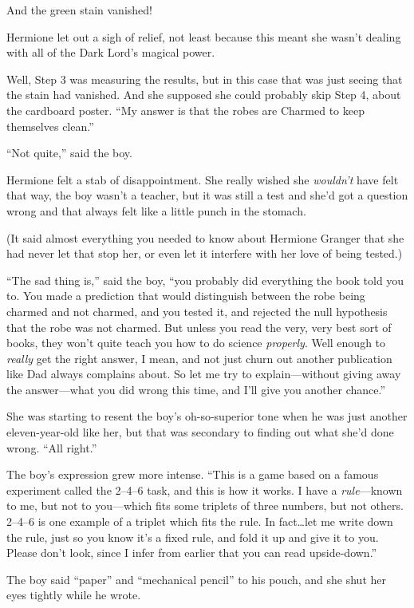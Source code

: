 And the green stain vanished!

Hermione let out a sigh of relief, not least because this meant she wasn’t dealing with all of the Dark Lord’s magical power.

Well, Step 3 was measuring the results, but in this case that was just seeing that the stain had vanished. And she supposed she could probably skip Step 4, about the cardboard poster. “My answer is that the robes are Charmed to keep themselves clean.”

“Not quite,” said the boy.

Hermione felt a stab of disappointment. She really wished she \emph{wouldn’t} have felt that way, the boy wasn’t a teacher, but it was still a test and she’d got a question wrong and that always felt like a little punch in the stomach.

(It said almost everything you needed to know about Hermione Granger that she had never let that stop her, or even let it interfere with her love of being tested.)

“The sad thing is,” said the boy, “you probably did everything the book told you to. You made a prediction that would distinguish between the robe being charmed and not charmed, and you tested it, and rejected the null hypothesis that the robe was not charmed. But unless you read the very, very best sort of books, they won’t quite teach you how to do science \emph{properly}. Well enough to \emph{really} get the right answer, I mean, and not just churn out another publication like Dad always complains about. So let me try to explain—without giving away the answer—what you did wrong this time, and I’ll give you another chance.”

She was starting to resent the boy’s oh-so-superior tone when he was just another eleven-year-old like her, but that was secondary to finding out what she’d done wrong. “All right.”

The boy’s expression grew more intense. “This is a game based on a famous experiment called the 2–4–6 task, and this is how it works. I have a \emph{rule}—known to me, but not to you—which fits some triplets of three numbers, but not others. 2–4–6 is one example of a triplet which fits the rule. In fact…let me write down the rule, just so you know it’s a fixed rule, and fold it up and give it to you. Please don’t look, since I infer from earlier that you can read upside-down.”

The boy said “paper” and “mechanical pencil” to his pouch, and she shut her eyes tightly while he wrote.

